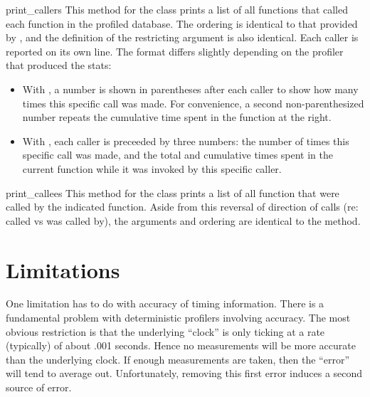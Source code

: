 \begin{methoddesc}[Stats]{print_callers}{}
This method for the  class prints a list of all functions
that called each function in the profiled database.  The ordering is
identical to that provided by , and the definition
of the restricting argument is also identical.  Each caller is reported on
its own line.  The format differs slightly depending on the profiler that
produced the stats:

\begin{itemize}
\item With , a number is shown in parentheses after each
  caller to show how many times this specific call was made.  For
  convenience, a second non-parenthesized number repeats the cumulative
  time spent in the function at the right.

\item With , each caller is preceeded by three numbers:
  the number of times this specific call was made, and the total and
  cumulative times spent in the current function while it was invoked by
  this specific caller.
\end{itemize}
\end{methoddesc}

\begin{methoddesc}[Stats]{print_callees}{}
This method for the  class prints a list of all function
that were called by the indicated function.  Aside from this reversal
of direction of calls (re: called vs was called by), the arguments and
ordering are identical to the  method.
\end{methoddesc}


\section{Limitations \label{profile-limits}}

One limitation has to do with accuracy of timing information.
There is a fundamental problem with deterministic profilers involving
accuracy.  The most obvious restriction is that the underlying ``clock''
is only ticking at a rate (typically) of about .001 seconds.  Hence no
measurements will be more accurate than the underlying clock.  If
enough measurements are taken, then the ``error'' will tend to average
out. Unfortunately, removing this first error induces a second source
of error.

